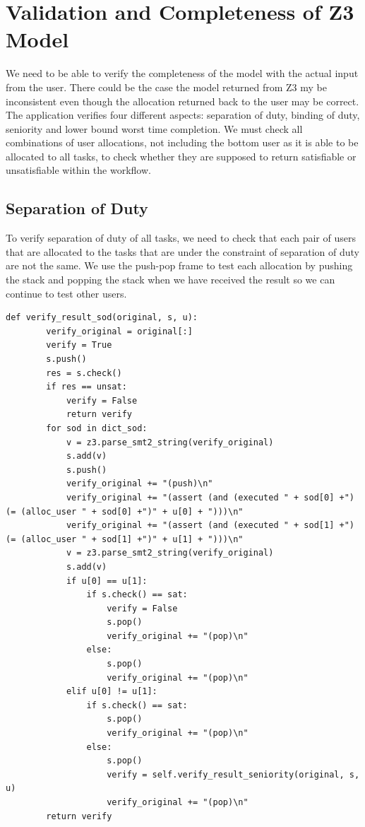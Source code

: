\documentclass[a4paper]{report}
\begin{document}
\section{Validation and Completeness of Z3 Model}
We need to be able to verify the completeness of the model with the actual input from the user. There could be the case the model returned from Z3 my be inconsistent even though the allocation returned back to the user may be correct. The application verifies four different aspects: separation of duty, binding of duty, seniority and lower bound worst time completion. We must check all combinations of user allocations, not including the bottom user as it is able to be allocated to all tasks, to check whether they are supposed to return satisfiable or unsatisfiable within the workflow.

\subsection{Separation of Duty}
To verify separation of duty of all tasks, we need to check that each pair of users that are allocated to the tasks that are under the constraint of separation of duty are not the same. We use the push-pop frame to test each allocation by pushing the stack and popping the stack when we have received the result so we can continue to test other users. 

\begin{lstlisting}[frame=single]
def verify_result_sod(original, s, u):
        verify_original = original[:]
        verify = True
        s.push()
        res = s.check()
        if res == unsat:
            verify = False
            return verify
        for sod in dict_sod:
            v = z3.parse_smt2_string(verify_original)
            s.add(v)
            s.push()
            verify_original += "(push)\n"
            verify_original += "(assert (and (executed " + sod[0] +") (= (alloc_user " + sod[0] +")" + u[0] + ")))\n"
            verify_original += "(assert (and (executed " + sod[1] +") (= (alloc_user " + sod[1] +")" + u[1] + ")))\n"
            v = z3.parse_smt2_string(verify_original)
            s.add(v)
            if u[0] == u[1]:
                if s.check() == sat:
                    verify = False
                    s.pop()
                    verify_original += "(pop)\n"
                else:
                    s.pop()
                    verify_original += "(pop)\n"
            elif u[0] != u[1]:
                if s.check() == sat:
                    s.pop()
                    verify_original += "(pop)\n"
                else:
                    s.pop()
                    verify = self.verify_result_seniority(original, s, u)
                    verify_original += "(pop)\n"
        return verify
\end{lstlisting}
\end{document}
